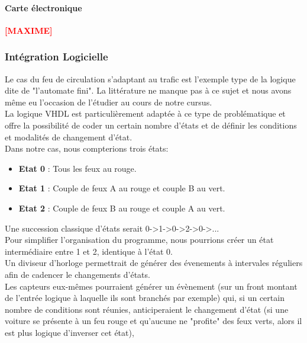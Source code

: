 		\paragraph{Carte électronique}

			\textbf{\Huge{\textcolor{red}{[MAXIME]}}}

	\subsubsection{Intégration Logicielle}

		Le cas du feu de circulation s'adaptant au trafic est l'exemple type de la logique dite de "l'automate fini". La littérature ne manque pas à ce sujet et nous avons même eu l'occasion de l'étudier au cours de notre cursus.\\

		La logique VHDL  est particulièrement adaptée à ce type de problématique et offre la possibilité de coder un certain nombre d'états et de définir les conditions et modalités de changement d'état.\\

		Dans notre cas, nous compterions trois états:
		\begin{itemize}
			\item \textbf{Etat 0} : Tous les feux au rouge.
			\item \textbf{Etat 1} : Couple de feux A au rouge et couple B au vert.
			\item \textbf{Etat 2} : Couple de feux B au rouge et couple A au vert.
		\end{itemize}

		\vspace {12pt}
		Une succession classique d'états serait 0->1->0->2->0->...\\
		Pour simplifier l'organisation du programme, nous pourrions créer un état intermédiaire entre 1 et 2, identique à l'état 0.\\

		Un diviseur d'horloge permettrait de générer des évenements à intervales réguliers afin de cadencer le changements d'états.\\
		Les capteurs eux-mêmes pourraient générer un évènement (sur un front montant de l'entrée logique à laquelle ils sont branchés par exemple) qui, si un certain nombre de conditions sont réunies, anticiperaient le changement d'état (si une voiture se présente à un feu rouge et qu'aucune ne "profite" des feux verts, alors il est plus logique d'inverser cet état),

